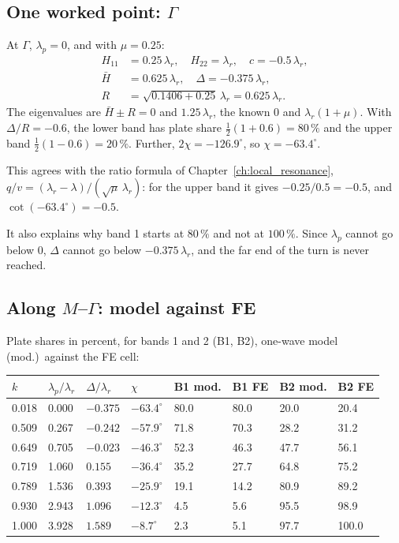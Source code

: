 \subsection{One worked point: $\Gamma$}
At $\Gamma$, $\lambda_p = 0$, and with $\mu = 0.25$:
\begin{align}
  H_{11} &= 0.25\,\lambda_r, \quad H_{22} = \lambda_r, \quad c = -0.5\,\lambda_r, \\
  \bar{H} &= 0.625\,\lambda_r, \quad \Delta = -0.375\,\lambda_r, \\
  R &= \sqrt{0.1406 + 0.25}\,\lambda_r = 0.625\,\lambda_r .
\end{align}
The eigenvalues are $\bar{H} \pm R = 0$ and $1.25\,\lambda_r$, the known $0$ and
$\lambda_r(1+\mu)$. With $\Delta/R = -0.6$, the lower band has plate share
$\tfrac12(1 + 0.6) = 80\,\%$ and the upper band $\tfrac12(1 - 0.6) = 20\,\%$.
Further, $2\chi = -126.9^\circ$, so $\chi = -63.4^\circ$.

This agrees with the ratio formula of Chapter~\ref{ch:local_resonance},
$q/v = (\lambda_r - \lambda)/(\sqrt{\mu}\,\lambda_r)$: for the upper band it gives
$-0.25/0.5 = -0.5$, and $\cot(-63.4^\circ) = -0.5$.

It also explains why band 1 starts at $80\,\%$ and not at $100\,\%$. Since $\lambda_p$
cannot go below 0, $\Delta$ cannot go below $-0.375\,\lambda_r$, and the far end of
the turn is never reached.

\subsection{Along $M$--$\Gamma$: model against FE}
Plate shares in percent, for bands 1 and 2 (B1, B2), one-wave model (mod.)\ against
the FE cell:

\begin{center}
\begin{tabular}{|l|l|l|l|l|l|l|l|}
\hline
$k$ & $\lambda_p/\lambda_r$ & $\Delta/\lambda_r$ & $\chi$ & B1 mod. & B1 FE & B2 mod. & B2 FE \\
\hline
0.018 & 0.000 & $-0.375$ & $-63.4^\circ$ & 80.0 & 80.0 & 20.0 & 20.4 \\
0.509 & 0.267 & $-0.242$ & $-57.9^\circ$ & 71.8 & 70.3 & 28.2 & 31.2 \\
0.649 & 0.705 & $-0.023$ & $-46.3^\circ$ & 52.3 & 46.3 & 47.7 & 56.1 \\
0.719 & 1.060 & $0.155$ & $-36.4^\circ$ & 35.2 & 27.7 & 64.8 & 75.2 \\
0.789 & 1.536 & $0.393$ & $-25.9^\circ$ & 19.1 & 14.2 & 80.9 & 89.2 \\
0.930 & 2.943 & $1.096$ & $-12.3^\circ$ & 4.5 & 5.6 & 95.5 & 98.9 \\
1.000 & 3.928 & $1.589$ & $-8.7^\circ$ & 2.3 & 5.1 & 97.7 & 100.0 \\
\hline
\end{tabular}
\end{center}

